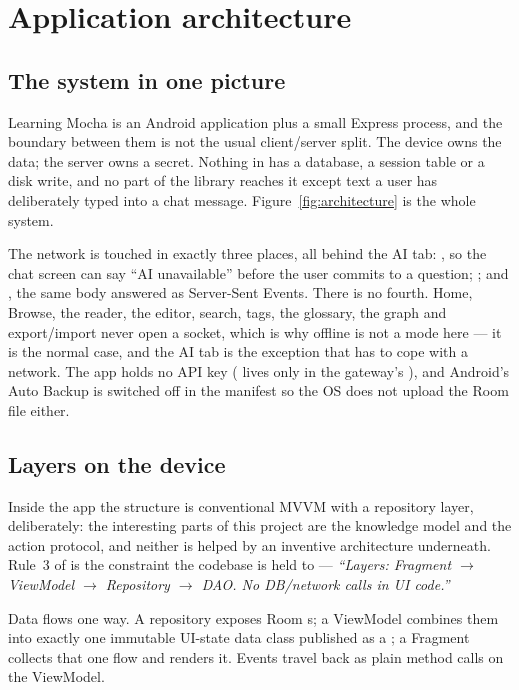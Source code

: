 \section{Application architecture}
\label{sec:arch}

\subsection{The system in one picture}

Learning Mocha is an Android application plus a small Express process, and the boundary between them
is not the usual client/server split. The device owns the data; the server owns a secret. Nothing in
 has a database, a session table or a disk write, and no part of the library reaches
it except text a user has deliberately typed into a chat message. Figure~\ref{fig:architecture} is
the whole system.



The network is touched in exactly three places, all behind the AI tab: , so the
chat screen can say ``AI unavailable'' before the user commits to a question; ;
and , the same body answered as Server-Sent Events. There is no fourth.
Home, Browse, the reader, the editor, search, tags, the glossary, the graph and export/import never
open a socket, which is why offline is not a mode here --- it is the normal case, and the AI tab is
the exception that has to cope with a network. The app holds no API key
( lives only in the gateway's ), and Android's Auto Backup is
switched off in the manifest so the OS does not upload the Room file either.

\subsection{Layers on the device}

Inside the app the structure is conventional MVVM with a repository layer, deliberately: the
interesting parts of this project are the knowledge model and the action protocol, and neither is
helped by an inventive architecture underneath. Rule~3 of  is the constraint the
codebase is held to --- \emph{``Layers: Fragment $\rightarrow$ ViewModel $\rightarrow$ Repository
$\rightarrow$ DAO. No DB/network calls in UI code.''}

Data flows one way. A repository exposes Room s; a ViewModel combines them into exactly
one immutable UI-state data class published as a ; a Fragment collects that one flow
and renders it. Events travel back as plain method calls on the ViewModel.

